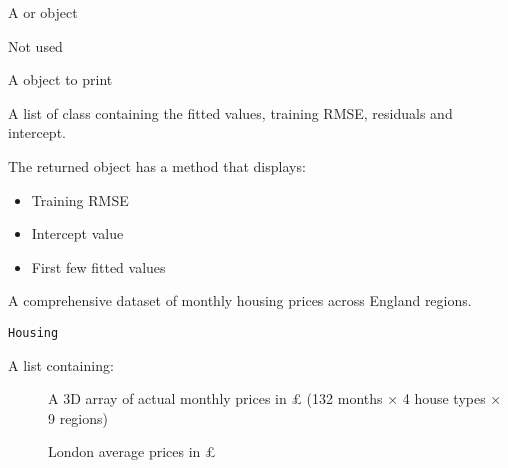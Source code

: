 \documentclass[a4paper]{book}
\begin{document}
%
\begin{Arguments}
\begin{ldescription}
\item[\code{object}] A  or  object

\item[\code{...}] Not used

\item[\code{x}] A  object to print
\end{ldescription}
\end{Arguments}
%
\begin{Value}
A list of class  containing the fitted values,
training RMSE, residuals and intercept.

The returned object has a  method that displays:
\begin{itemize}

\item{} Training RMSE
\item{} Intercept value
\item{} First few fitted values

\end{itemize}

\end{Value}
%
\begin{SeeAlso}
\end{SeeAlso}
%
\begin{Examples}
\end{Examples}
%
\begin{Description}
A comprehensive dataset of monthly housing prices across England regions.
\end{Description}
%
\begin{Usage}
\begin{verbatim}
Housing
\end{verbatim}
\end{Usage}
%
\begin{Format}
A list containing:
\begin{description}

\item[] A 3D array of actual monthly prices in £ (132 months × 4 house types × 9 regions)
\item[] London average prices in £

\end{description}

\end{Format}
\end{document}
